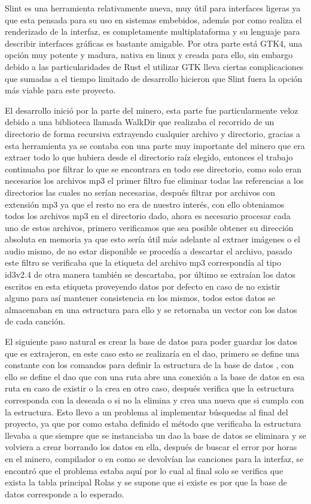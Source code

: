 \documentclass[12pt,a4paper]{article}
\begin{document}
Slint es una herramienta relativamente nueva, muy útil para interfaces ligeras ya que esta pensada para su uso en 
sistemas embebidos, además por como realiza el renderizado de la interfaz, es completamente multiplataforma y 
su lenguaje para describir interfaces gráficas es bastante amigable. Por otra parte está GTK4, una opción 
muy potente y madura, nativa en linux y creada para ello, sin embargo debido a las particularidades de Rust
el utilizar GTK lleva ciertas complicaciones que sumadas a el tiempo limitado de desarrollo
hicieron que Slint fuera la opción más viable para este proyecto.

El desarrollo inició por la parte del minero, esta parte fue particularmente veloz debido a una biblioteca llamada WalkDir
que realizaba el recorrido de un directorio de forma recursiva extrayendo cualquier archivo y directorio, gracias a esta 
herramienta ya se contaba con una parte muy importante del minero que era extraer todo lo que hubiera desde el directorio 
raíz elegido, entonces el trabajo continuaba por filtrar lo que se encontrara en todo ese directorio, como solo eran necesarios
los archivos mp3 el primer filtro fue eliminar todas las referencias a los directorios las cuales no serían necesarias,
después filtrar por archivos con extensión mp3 ya que el resto no era de nuestro interés, con ello obteniamos todos los archivos mp3
en el directorio dado, ahora es necesario procesar cada uno de estos archivos, primero verificamos que sea posible 
obtener su dirección absoluta en memoria ya que esto sería útil más adelante al extraer imágenes o el audio mismo, 
de no estar disponible se procedía a descartar el archivo, pasado este filtro se verificaba que la etiqueta del
archivo mp3 correspondía al tipo id3v2.4 de otra manera también se descartaba, por último se extraían los datos 
escritos en esta etiqueta proveyendo datos por defecto en caso de no existir alguno para así mantener consistencia
en los mismos, todos estos datos se almacenaban en una estructura para ello y se retornaba un vector con los datos
de cada canción.

El siguiente paso natural es crear la base de datos para poder guardar los datos que es extrajeron, en este caso
esto se realizaría en el dao, primero se define una constante con los comandos para definir la estructura de la base de datos
, con ello se define el dao que con una ruta abre una conexión a la base de datos en esa ruta en caso de existir o la crea en 
otro caso, después verifica que la estructura corresponda con la deseada o si no la elimina y crea una nueva que si cumpla con 
la estructura. Esto llevo a un problema al implementar búsquedas al final del proyecto, ya que por como estaba definido 
el método que verificaba la estructura llevaba a que siempre que se instanciaba un dao la base de datos se eliminara y se 
volviera a crear borrando los datos en ella, después de buscar el error por horas en el minero, compilador o en como se devolvían
las canciones para la interfaz, se encontró que el problema estaba aquí por lo cual al final solo se verifica que exista la tabla 
principal Rolas y se supone que si existe es por que la base de datos corresponde a lo esperado.
\end{document}
